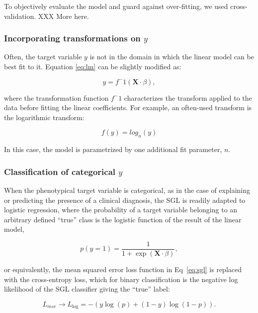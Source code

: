 To objectively evaluate the model and guard against over-fitting, we used
cross-validation. XXX More here.

\subsubsection*{Incorporating transformations on $y$}

Often, the target variable $y$ is not in the domain in which the linear model
can be best fit to it. Equation \ref{eq:lm} can be slightly modified as:

\begin{equation}
y = f^-1(\mathbf{X} \cdot \beta),
\label{eq:lm}
\end{equation}

where the transformation function $f^-1$ characterizes the transform applied to
the data before fitting the linear coefficients. For example, an often-used
transform is the logarithmic transform:

\begin{equation}
f(y) = log_n(y)
\label{eq:log_nonlinearity}
\end{equation}

In this case, the model is parametrized by one additional fit parameter, $n$.

\subsubsection*{Classification of categorical $y$}
When the phenotypical target variable is categorical, as in the case of
explaining or predicting the presence of a clinical diagnosis, the SGL is
readily adapted to logistic regression, where the probability of a target
variable belonging to an arbitrary defined ``true'' class is the logistic
function of the result of the linear model,

\begin{equation}
    p(y = 1) = \frac{1}{1 + \exp(\mathbf{X}\cdot \beta)},
    \label{eq:logit}
\end{equation}

or equivalently, the mean squared error loss function in Eq~\eqref{eq:sgl} is
replaced with the cross-entropy loss, which for binary classification is the
negative log likelihood of the SGL classifier giving the ``true'' label:

\begin{equation}
    L_{mse} \rightarrow L_{\log} = -\left(y \log(p) + (1 - y) \log(1 - p)\right).
    \label{eq:logloss}
\end{equation}


